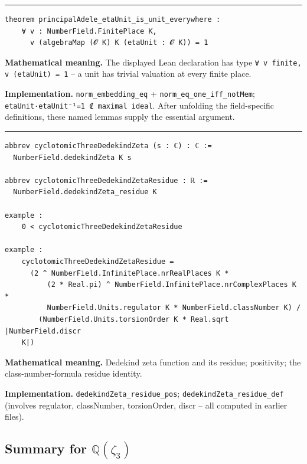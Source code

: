 \documentclass[UTF8,a4paper,11pt,fontset=fandol]{ctexart}
\theoremstyle{definition}
\newcommand{\statementsep}{\par\medskip\hrule\medskip}
\begin{document}
\statementsep
\begin{verbatim}
theorem principalAdele_etaUnit_is_unit_everywhere :
    ∀ v : NumberField.FinitePlace K,
      v (algebraMap (𝓞 K) K (etaUnit : 𝓞 K)) = 1
\end{verbatim}
\noindent\textbf{Mathematical meaning.} The displayed Lean declaration has type \texttt{∀ v finite, v (etaUnit) = 1} -- a unit has trivial valuation at every finite place.\par
\noindent\textbf{Implementation.} \texttt{norm\_\allowbreak{}embedding\_\allowbreak{}eq} + \texttt{norm\_\allowbreak{}eq\_\allowbreak{}one\_\allowbreak{}iff\_\allowbreak{}notMem}; \texttt{etaUnit·etaUnit⁻¹=1 ∉ maximal ideal}. After unfolding the field-specific definitions, these named lemmas supply the essential argument.\par
\statementsep
\begin{verbatim}
abbrev cyclotomicThreeDedekindZeta (s : ℂ) : ℂ :=
  NumberField.dedekindZeta K s

abbrev cyclotomicThreeDedekindZetaResidue : ℝ :=
  NumberField.dedekindZeta_residue K

example :
    0 < cyclotomicThreeDedekindZetaResidue

example :
    cyclotomicThreeDedekindZetaResidue =
      (2 ^ NumberField.InfinitePlace.nrRealPlaces K *
          (2 * Real.pi) ^ NumberField.InfinitePlace.nrComplexPlaces K *
          NumberField.Units.regulator K * NumberField.classNumber K) /
        (NumberField.Units.torsionOrder K * Real.sqrt |NumberField.discr
    K|)
\end{verbatim}
\noindent\textbf{Mathematical meaning.} Dedekind zeta function and its residue; positivity; the class-number-formula residue identity.\par
\noindent\textbf{Implementation.} \texttt{dedekindZeta\_\allowbreak{}residue\_\allowbreak{}pos}; \texttt{dedekindZeta\_\allowbreak{}residue\_\allowbreak{}def} (involves regulator, classNumber, torsionOrder, discr -- all computed in earlier files).\par


\subsection{Summary for \(\mathbb Q(\zeta_3)\)}
\end{document}
